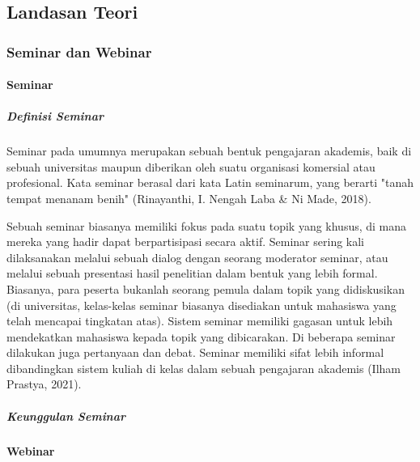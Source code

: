 \chapter{\babDua}

\section{Landasan Teori}

\subsection{Seminar dan Webinar}
\subsubsection{Seminar}
\paragraph{Definisi Seminar}
Seminar pada umumnya merupakan sebuah bentuk pengajaran akademis, baik di sebuah universitas maupun diberikan oleh suatu organisasi komersial atau profesional. Kata seminar berasal dari kata Latin seminarum, yang berarti "tanah tempat menanam benih" (Rinayanthi, I. Nengah Laba \& Ni Made, 2018).

Sebuah seminar biasanya memiliki fokus pada suatu topik yang khusus, di mana mereka yang hadir dapat berpartisipasi secara aktif. Seminar sering kali dilaksanakan melalui sebuah dialog dengan seorang moderator seminar, atau melalui sebuah presentasi hasil penelitian dalam bentuk yang lebih formal. Biasanya, para peserta bukanlah seorang pemula dalam topik yang didiskusikan (di universitas, kelas-kelas seminar biasanya disediakan untuk mahasiswa yang telah mencapai tingkatan atas). Sistem seminar memiliki gagasan untuk lebih mendekatkan mahasiswa kepada topik yang dibicarakan. Di beberapa seminar dilakukan juga pertanyaan dan debat. Seminar memiliki sifat lebih informal dibandingkan sistem kuliah di kelas dalam sebuah pengajaran akademis (Ilham Prastya, 2021).

\paragraph{Keunggulan Seminar}
\subsubsection{Webinar}
